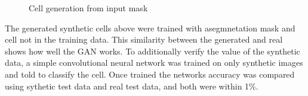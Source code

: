\documentclass[ms,electronic,oneside,twosidetoc,letterpaper,chaptercenter,parttop]{byumsphd}
\begin{document}
\begin{figure}[H]
   \quad
   \quad
   \quad
   \quad
  \caption{Cell generation from input mask}
\end{figure}

The generated synthetic cells above were trained with asegmnetation mask and cell not in the training
data. This similarity between the generated and real shows how well the GAN works. To additionally verify
the value of the synthetic data, a simple convolutional neural network was trained on only synthetic images
and told to classify the cell. Once trained the networks accuracy was compared using sythetic test data and real test
data, and both were within 1\%.

\end{document}
